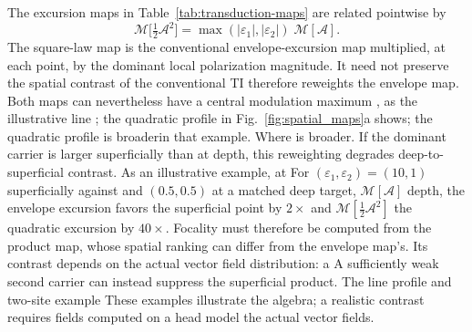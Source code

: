 \documentclass[11pt,a4paper]{article}
\newcommand{\half}{\tfrac{1}{2}}
\providecommand{\DIFaddtex}[1]{{\protect\color{blue} \sf #1}} %
\providecommand{\DIFdeltex}[1]{{\protect\color{red} \scriptsize #1}} %
\providecommand{\DIFaddbegin}{} %
\providecommand{\DIFaddend}{} %
\providecommand{\DIFdelbegin}{} %
\providecommand{\DIFdelend}{} %
\providecommand{\DIFadd}[1]{\texorpdfstring{\DIFaddtex{#1}}{#1}} %
\providecommand{\DIFdel}[1]{\texorpdfstring{\DIFdeltex{#1}}{}} %
\begin{document}
The excursion maps in Table~\ref{tab:transduction-maps} are related pointwise by
\begin{equation}
\mathcal{M}\big[\tfrac12\mathcal A^2\big]=\max(|\varepsilon_1|,|\varepsilon_2|)\;\mathcal{M}[\mathcal A].
\label{eq:reweight}
\end{equation}
The \DIFdelbegin \DIFdel{square-law map is the conventional envelope-excursion map multiplied, at each point,
by the }\DIFdelend dominant local polarization \DIFdelbegin \DIFdel{magnitude. It need not preserve the spatial contrast
of the conventional TI }\DIFdelend \DIFaddbegin \DIFadd{therefore reweights the envelope }\DIFaddend map.
Both maps can \DIFdelbegin \DIFdel{nevertheless }\DIFdelend have a central modulation maximum\DIFdelbegin \DIFdel{, as the illustrative line }\DIFdelend \DIFaddbegin \DIFadd{; the quadratic }\DIFaddend profile in
Fig.~\ref{fig:spatial_maps}a \DIFdelbegin \DIFdel{shows;
the quadratic profile is broaderin that example. Where }\DIFdelend \DIFaddbegin \DIFadd{is broader. If }\DIFaddend the dominant carrier is larger
superficially\DIFdelbegin \DIFdel{than at depth}\DIFdelend , this reweighting degrades deep-to-superficial contrast. \DIFdelbegin \DIFdel{As an illustrative example, at
}\DIFdelend \DIFaddbegin \DIFadd{For
}\DIFaddend $(\varepsilon_1,\varepsilon_2)=(10,1)$ superficially \DIFdelbegin \DIFdel{against }\DIFdelend \DIFaddbegin \DIFadd{and }\DIFaddend $(0.5,0.5)$ at \DIFdelbegin \DIFdel{a matched
deep target,
$\mathcal{M}[\mathcal A]$ }\DIFdelend \DIFaddbegin \DIFadd{depth,
the envelope excursion }\DIFaddend favors the superficial point by $2\times$ and \DIFdelbegin \DIFdel{$\mathcal{M}[\half \mathcal A^2]$ }\DIFdelend \DIFaddbegin \DIFadd{the
quadratic excursion }\DIFaddend by $40\times$. \DIFdelbegin \DIFdel{Focality must therefore be computed from the product map, whose spatial ranking
can differ from the envelope map's. Its contrast depends on the actual vector
field distribution: a }\DIFdelend \DIFaddbegin \DIFadd{A }\DIFaddend sufficiently weak second carrier can
\DIFaddbegin \DIFadd{instead }\DIFaddend suppress the superficial product. \DIFdelbegin \DIFdel{The line profile and two-site example }\DIFdelend \DIFaddbegin \DIFadd{These examples }\DIFaddend illustrate the
algebra; \DIFdelbegin \DIFdel{a }\DIFdelend realistic contrast requires \DIFdelbegin \DIFdel{fields computed on a head model}\DIFdelend \DIFaddbegin \DIFadd{the actual vector fields}\DIFaddend .
\end{document}
